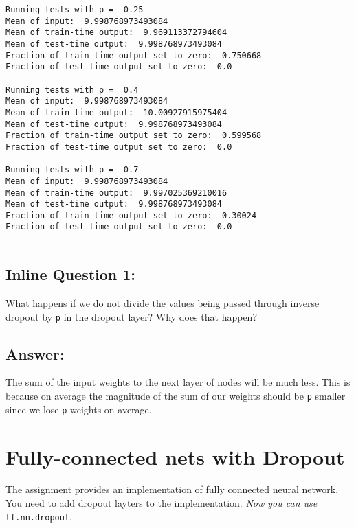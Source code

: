 \documentclass[11pt]{article}
\begin{document}
    \begin{Verbatim}[commandchars=\\\{\}]
Running tests with p =  0.25
Mean of input:  9.998768973493084
Mean of train-time output:  9.969113372794604
Mean of test-time output:  9.998768973493084
Fraction of train-time output set to zero:  0.750668
Fraction of test-time output set to zero:  0.0

Running tests with p =  0.4
Mean of input:  9.998768973493084
Mean of train-time output:  10.00927915975404
Mean of test-time output:  9.998768973493084
Fraction of train-time output set to zero:  0.599568
Fraction of test-time output set to zero:  0.0

Running tests with p =  0.7
Mean of input:  9.998768973493084
Mean of train-time output:  9.997025369210016
Mean of test-time output:  9.998768973493084
Fraction of train-time output set to zero:  0.30024
Fraction of test-time output set to zero:  0.0


    \end{Verbatim}

    \hypertarget{inline-question-1}{%
\subsection{Inline Question 1:}\label{inline-question-1}}

What happens if we do not divide the values being passed through inverse
dropout by \texttt{p} in the dropout layer? Why does that happen?

    \hypertarget{answer}{%
\subsection{Answer:}\label{answer}}

The sum of the input weights to the next layer of nodes will be much
less. This is because on average the magnitude of the sum of our weights
should be \texttt{p} smaller since we lose \texttt{p} weights on
average.

    \hypertarget{fully-connected-nets-with-dropout}{%
\section{Fully-connected nets with
Dropout}\label{fully-connected-nets-with-dropout}}

The assignment provides an implementation of fully connected neural
network. You need to add dropout layters to the implementation.
\emph{Now you can use} \texttt{tf.nn.dropout}.
\end{document}
